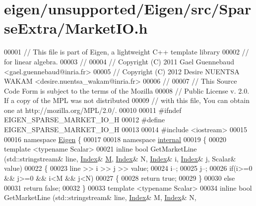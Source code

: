 \hypertarget{eigen_2unsupported_2_eigen_2src_2_sparse_extra_2_market_i_o_8h_source}{}\section{eigen/unsupported/\+Eigen/src/\+Sparse\+Extra/\+Market\+IO.h}
\label{eigen_2unsupported_2_eigen_2src_2_sparse_extra_2_market_i_o_8h_source}

\begin{DoxyCode}
00001 \textcolor{comment}{// This file is part of Eigen, a lightweight C++ template library}
00002 \textcolor{comment}{// for linear algebra.}
00003 \textcolor{comment}{//}
00004 \textcolor{comment}{// Copyright (C) 2011 Gael Guennebaud <gael.guennebaud@inria.fr>}
00005 \textcolor{comment}{// Copyright (C) 2012 Desire NUENTSA WAKAM <desire.nuentsa\_wakam@inria.fr>}
00006 \textcolor{comment}{//}
00007 \textcolor{comment}{// This Source Code Form is subject to the terms of the Mozilla}
00008 \textcolor{comment}{// Public License v. 2.0. If a copy of the MPL was not distributed}
00009 \textcolor{comment}{// with this file, You can obtain one at http://mozilla.org/MPL/2.0/.}
00010 
00011 \textcolor{preprocessor}{#ifndef EIGEN\_SPARSE\_MARKET\_IO\_H}
00012 \textcolor{preprocessor}{#define EIGEN\_SPARSE\_MARKET\_IO\_H}
00013 
00014 \textcolor{preprocessor}{#include <iostream>}
00015 
00016 \textcolor{keyword}{namespace }\hyperlink{namespace_eigen}{Eigen} \{ 
00017 
00018 \textcolor{keyword}{namespace }\hyperlink{namespaceinternal}{internal} 
00019 \{
00020   \textcolor{keyword}{template} <\textcolor{keyword}{typename} Scalar>
00021   \textcolor{keyword}{inline} \textcolor{keywordtype}{bool} GetMarketLine (std::stringstream& line, \hyperlink{namespace_eigen_a62e77e0933482dafde8fe197d9a2cfde}{Index}& \hyperlink{group___core___module_class_eigen_1_1_matrix}{M}, \hyperlink{namespace_eigen_a62e77e0933482dafde8fe197d9a2cfde}{Index}& N, 
      \hyperlink{namespace_eigen_a62e77e0933482dafde8fe197d9a2cfde}{Index}& i, \hyperlink{namespace_eigen_a62e77e0933482dafde8fe197d9a2cfde}{Index}& j, Scalar& value)
00022   \{
00023     line >> i >> j >> value;
00024     i--;
00025     j--;
00026     \textcolor{keywordflow}{if}(i>=0 && j>=0 && i<M && j<N)
00027     \{
00028       \textcolor{keywordflow}{return} \textcolor{keyword}{true}; 
00029     \}
00030     \textcolor{keywordflow}{else}
00031       \textcolor{keywordflow}{return} \textcolor{keyword}{false};
00032   \}
00033   \textcolor{keyword}{template} <\textcolor{keyword}{typename} Scalar>
00034   \textcolor{keyword}{inline} \textcolor{keywordtype}{bool} GetMarketLine (std::stringstream& line, \hyperlink{namespace_eigen_a62e77e0933482dafde8fe197d9a2cfde}{Index}& M, \hyperlink{namespace_eigen_a62e77e0933482dafde8fe197d9a2cfde}{Index}& N, 

\end{DoxyCode}
